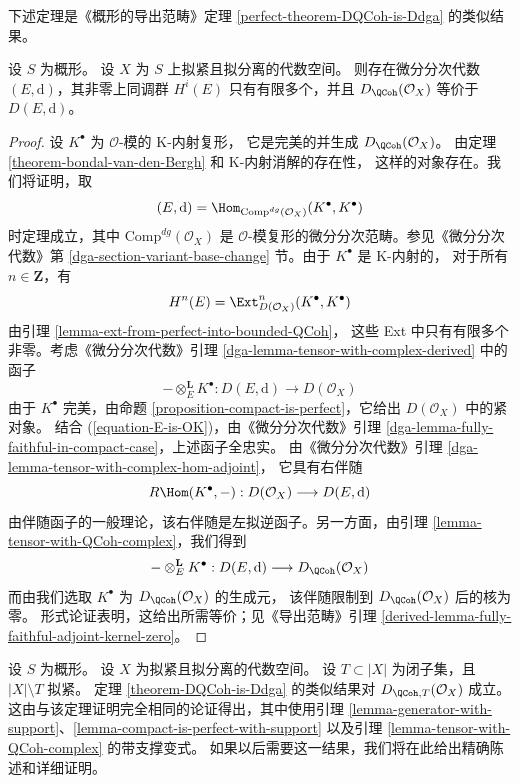 \noindent
下述定理是《概形的导出范畴》定理
\ref{perfect-theorem-DQCoh-is-Ddga} 的类似结果。

\begin{theorem}
\label{theorem-DQCoh-is-Ddga}
设 $S$ 为概形。
设 $X$ 为 $S$ 上拟紧且拟分离的代数空间。
则存在微分分次代数 $(E, \text{d})$，其非零上同调群 $H^i(E)$
只有有限多个，并且 $D_\QCoh(\mathcal{O}_X)$
等价于 $D(E, \text{d})$。
\end{theorem}

\begin{proof}
设 $K^\bullet$ 为 $\mathcal{O}$-模的 K-内射复形，%
它是完美的并生成 $D_\QCoh(\mathcal{O}_X)$。
由定理 \ref{theorem-bondal-van-den-Bergh} 和 K-内射消解的存在性，
这样的对象存在。我们将证明，取
$$
(E, \text{d}) = \Hom_{\text{Comp}^{dg}(\mathcal{O}_X)}(K^\bullet, K^\bullet)
$$
时定理成立，其中 $\text{Comp}^{dg}(\mathcal{O}_X)$ 是
$\mathcal{O}$-模复形的微分分次范畴。参见《微分分次代数》第
\ref{dga-section-variant-base-change} 节。由于 $K^\bullet$ 是 K-内射的，
对于所有 $n \in \mathbf{Z}$，有
\begin{equation}
\label{equation-E-is-OK}
H^n(E) = \Ext^n_{D(\mathcal{O}_X)}(K^\bullet, K^\bullet)
\end{equation}
由引理 \ref{lemma-ext-from-perfect-into-bounded-QCoh}，
这些 Ext 中只有有限多个非零。考虑《微分分次代数》引理
\ref{dga-lemma-tensor-with-complex-derived} 中的函子
$$
- \otimes_E^\mathbf{L} K^\bullet :
D(E, \text{d}) \longrightarrow D(\mathcal{O}_X)
$$
由于 $K^\bullet$ 完美，由命题
\ref{proposition-compact-is-perfect}，它给出
$D(\mathcal{O}_X)$ 中的紧对象。%
结合 (\ref{equation-E-is-OK})，由《微分分次代数》引理
\ref{dga-lemma-fully-faithful-in-compact-case}，上述函子全忠实。
由《微分分次代数》引理
\ref{dga-lemma-tensor-with-complex-hom-adjoint}，%
它具有右伴随
$$
R\Hom(K^\bullet, - ) : D(\mathcal{O}_X) \longrightarrow D(E, \text{d})
$$
由伴随函子的一般理论，该右伴随是左拟逆函子。另一方面，由引理
\ref{lemma-tensor-with-QCoh-complex}，我们得到
$$
- \otimes_E^\mathbf{L} K^\bullet :
D(E, \text{d}) \longrightarrow D_\QCoh(\mathcal{O}_X)
$$
而由我们选取 $K^\bullet$ 为 $D_\QCoh(\mathcal{O}_X)$ 的生成元，
该伴随限制到 $D_\QCoh(\mathcal{O}_X)$ 后的核为零。
形式论证表明，这给出所需等价；见《导出范畴》引理
\ref{derived-lemma-fully-faithful-adjoint-kernel-zero}。
\end{proof}

\begin{remark}[带支撑的变式]
\label{remark-DQCoh-is-Ddga-with-support}
设 $S$ 为概形。%
设 $X$ 为拟紧且拟分离的代数空间。
设 $T \subset |X|$ 为闭子集，且 $|X| \setminus T$ 拟紧。
定理 \ref{theorem-DQCoh-is-Ddga} 的类似结果对
$D_{\QCoh, T}(\mathcal{O}_X)$ 成立。
这由与该定理证明完全相同的论证得出，其中使用引理
\ref{lemma-generator-with-support}、\ref{lemma-compact-is-perfect-with-support}
以及引理 \ref{lemma-tensor-with-QCoh-complex} 的带支撑变式。
如果以后需要这一结果，我们将在此给出精确陈述和详细证明。
\end{remark}

